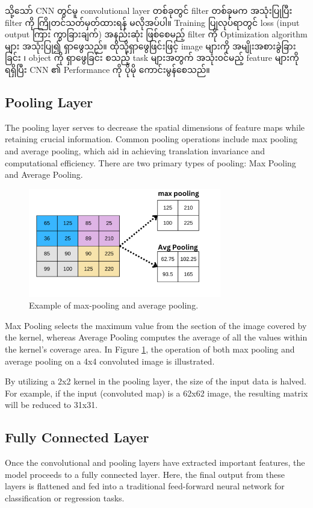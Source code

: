 သို့သော် CNN တွင်မူ convolutional layer တစ်ခုတွင် filter တစ်ခုမက အသုံးပြုပြီး filter ကို ကြိုတင်သတ်မှတ်ထားရန် မလိုအပ်ပါ။ Training ပြုလုပ်ရာတွင် loss (input output ကြား ကွာခြားချက်) အနည်းဆုံး ဖြစ်စေမည့် filter ကို Optimization algorithm များ အသုံးပြု၍ ရှာဖွေသည်။ ထိုသို့ရှာဖွေဖြင်းဖြင့် image များကို အမျိုးအစားခွဲခြားခြင်း ၊ object ကို ရှာဖွေခြင်း စသည့် task များအတွက် အသုံး၀င်မည့် feature များကို ရရှိပြီး CNN ၏ Performance ကို ပိုမို ကောင်းမွန်စေသည်။ 


\subsection{Pooling Layer}\label{poolLayer}
The pooling layer serves to decrease the spatial dimensions of feature maps while retaining crucial information. Common pooling operations include max pooling and average pooling, which aid in achieving translation invariance and computational efficiency. There are two primary types of pooling: Max Pooling and Average Pooling.

\vspace{0.5em}
\begin{figure}[h]%
\centering
\includegraphics[width=0.75\textwidth]{imgs/cnn_pool.png}
\caption{Example of max-pooling and average pooling.}\label{fig:CNNPooling}
\end{figure}

Max Pooling selects the maximum value from the section of the image covered by the kernel, whereas Average Pooling computes the average of all the values within the kernel's coverage area. In Figure \ref{fig:CNNPooling}, the operation of both max pooling and average pooling on a 4x4 convoluted image is illustrated.

By utilizing a 2x2 kernel in the pooling layer, the size of the input data is halved. For example, if the input (convoluted map) is a 62x62 image, the resulting matrix will be reduced to 31x31.


\subsection{Fully Connected Layer}\label{FCLayer}
Once the convolutional and pooling layers have extracted important features, the model proceeds to a fully connected layer. Here, the final output from these layers is flattened and fed into a traditional feed-forward neural network for classification or regression tasks.

